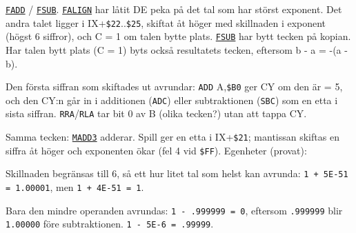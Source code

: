 \begin{Listing}
\Gap
\begin{Cmt}\par\noindent \hyperlink{l:FADD}{\texttt{FADD}} / \hyperlink{l:FSUB}{\texttt{FSUB}}. \hyperlink{l:FALIGN}{\texttt{FALIGN}} har låtit DE peka på det tal som har störst exponent. Det andra talet ligger i IX+\texttt{\$22}..\texttt{\$25}, skiftat åt höger med skillnaden i exponent (högst 6 siffror), och C = 1 om talen bytte plats. \hyperlink{l:FSUB}{\texttt{FSUB}} har bytt tecken på kopian. Har talen bytt plats (C = 1) byts också resultatets tecken, eftersom b - a = -(a - b).\par
\par\noindent Den första siffran som skiftades ut avrundar: \texttt{ADD} A,\texttt{\$B0} ger CY om den är {}= 5, och den CY:n går in i additionen (\texttt{ADC}) eller subtraktionen (\texttt{SBC}) som en etta i sista siffran. \texttt{RRA}/\texttt{RLA} tar bit 0 av B (olika tecken?) utan att tappa CY.\par
\par\noindent Samma tecken: \hyperlink{l:MADD3}{\texttt{MADD3}} adderar. Spill ger en etta i IX+\texttt{\$21}; mantissan skiftas en siffra åt höger och exponenten ökar (fel 4 vid \texttt{\$FF}). Egenheter (provat):\par
\begin{Punkter}
\item Skillnaden begränsas till 6, så ett hur litet tal som helst kan avrunda: \texttt{1 + 5E-51 = 1.00001}, men \texttt{1 + 4E-51 = 1}.
\item Bara den mindre operanden avrundas: \texttt{1 - .999999 = 0}, eftersom \texttt{.999999} blir \texttt{1.00000} före subtraktionen. \texttt{1 - 5E-6 = .99999}.
\end{Punkter}\end{Cmt}

\end{Listing}
